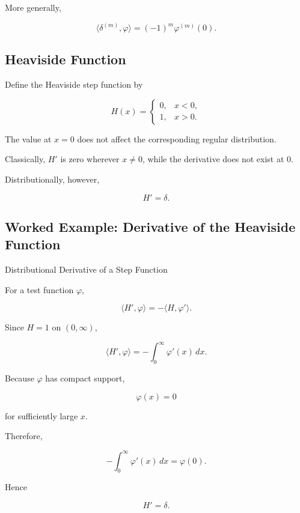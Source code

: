 More generally,

\[
\boxed{
\langle\delta^{(m)},\varphi\rangle
=
(-1)^m
\varphi^{(m)}(0).
}
\]

\subsection{Heaviside Function}
\label{subsec:heaviside-function}

Define the Heaviside step function by

\[
H(x)
=
\begin{cases}
0, & x<0,\\
1, & x>0.
\end{cases}
\]

The value at \(x=0\) does not affect the corresponding regular
distribution.

Classically, \(H'\) is zero wherever \(x\neq0\), while the derivative
does not exist at \(0\).

Distributionally, however,

\[
\boxed{
H'=\delta.
}
\]

\subsection{Worked Example: Derivative of the Heaviside Function}
\label{subsec:worked-heaviside-derivative}

\begin{workedexamplebox}{Distributional Derivative of a Step Function}

For a test function \(\varphi\),

\[
\langle H',\varphi\rangle
=
-
\langle H,\varphi'\rangle.
\]

Since \(H=1\) on \((0,\infty)\),

\[
\langle H',\varphi\rangle
=
-
\int_0^\infty
\varphi'(x)\,dx.
\]

Because \(\varphi\) has compact support,

\[
\varphi(x)=0
\]

for sufficiently large \(x\).

Therefore,

\[
-
\int_0^\infty
\varphi'(x)\,dx
=
\varphi(0).
\]

Hence

\begin{answerbox}
\[
\boxed{
H'=\delta.
}
\]
\end{answerbox}

\end{workedexamplebox}

